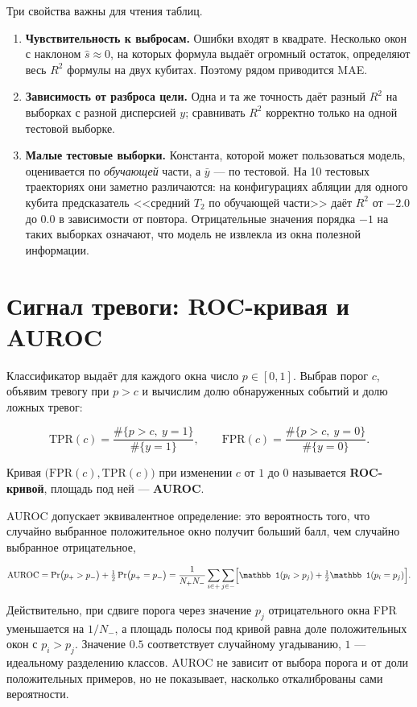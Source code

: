 \documentclass[12pt,a4paper]{report}
\numberwithin{equation}{chapter}
\begin{document}
Три свойства важны для чтения таблиц.
\begin{enumerate}
\item \textbf{Чувствительность к выбросам.} Ошибки входят в квадрате.
      Несколько окон с наклоном $\hat s\approx0$, на которых формула выдаёт
      огромный остаток, определяют весь $R^2$ формулы на двух кубитах.
      Поэтому рядом приводится MAE.
\item \textbf{Зависимость от разброса цели.} Одна и та же точность даёт разный
      $R^2$ на выборках с разной дисперсией $y$; сравнивать $R^2$ корректно
      только на одной тестовой выборке.
\item \textbf{Малые тестовые выборки.} Константа, которой может пользоваться
      модель, оценивается по \emph{обучающей} части, а $\bar y$ --- по тестовой.
      На 10 тестовых траекториях они заметно различаются: на конфигурациях
      абляции для одного кубита предсказатель <<средний $T_2$ по обучающей
      части>> даёт $R^2$ от $-2.0$ до $0.0$ в зависимости от повтора.
      Отрицательные значения порядка $-1$ на таких выборках означают, что
      модель не извлекла из окна полезной информации.
\end{enumerate}

\section{Сигнал тревоги: ROC-кривая и AUROC}

Классификатор выдаёт для каждого окна число $p\in[0,1]$. Выбрав порог $c$,
объявим тревогу при $p>c$ и вычислим долю обнаруженных событий и долю ложных
тревог:
\begin{keybox}
\begin{equation}
\mathrm{TPR}(c)=\frac{\#\{p>c,\ y=1\}}{\#\{y=1\}},\qquad
\mathrm{FPR}(c)=\frac{\#\{p>c,\ y=0\}}{\#\{y=0\}} .
\end{equation}
\end{keybox}
Кривая $\bigl(\mathrm{FPR}(c),\mathrm{TPR}(c)\bigr)$ при изменении $c$ от $1$ до
$0$ называется \textbf{ROC-кривой}, площадь под ней --- \textbf{AUROC}.

AUROC допускает эквивалентное определение: это вероятность того, что
случайно выбранное положительное окно получит больший балл, чем случайно
выбранное отрицательное,
\begin{keybox}
\begin{equation}
\mathrm{AUROC}=\Pr\bigl(p_+>p_-\bigr)+\tfrac12\Pr\bigl(p_+=p_-\bigr)
=\frac1{N_+N_-}\sum_{i\in+}\sum_{j\in-}\Bigl[\mathbb 1(p_i>p_j)+\tfrac12\mathbb 1(p_i=p_j)\Bigr].
\end{equation}
\end{keybox}
Действительно, при сдвиге порога через значение $p_j$ отрицательного окна
FPR уменьшается на $1/N_-$, а площадь полосы под кривой равна доле
положительных окон с $p_i>p_j$. Значение $0.5$ соответствует случайному
угадыванию, $1$ --- идеальному разделению классов. AUROC не зависит от выбора
порога и от доли положительных примеров, но не показывает, насколько
откалиброваны сами вероятности.
\end{document}
